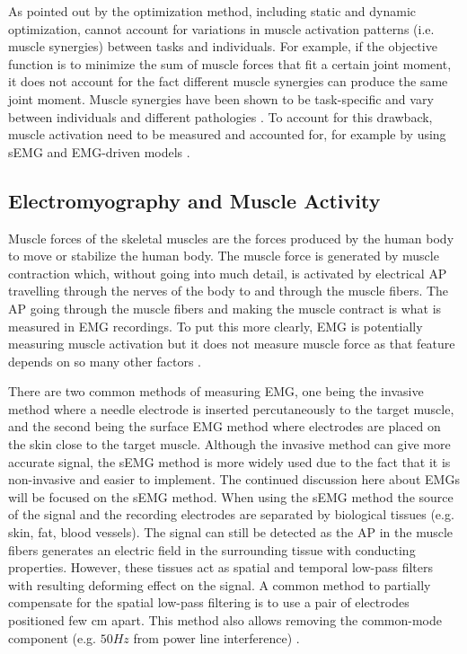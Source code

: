 As pointed out by \textcite{Pizzolato2015} the optimization method, including static and dynamic optimization, cannot account for variations in muscle activation patterns (i.e. muscle synergies) between tasks and individuals.
For example, if the objective function is to minimize the sum of muscle forces that fit a certain joint moment, it does not account for the fact different muscle synergies can produce the same joint moment. 
Muscle synergies have been shown to be task-specific and vary between individuals and different pathologies \cite{Ivanenko2016, Safavynia2011}.
To account for this drawback, muscle activation need to be measured and accounted for, for example by using \ac{sEMG} and \ac{EMG}-driven models \cite{Pizzolato2015}.

\subsection{Electromyography and Muscle Activity}
\label{sec:A-EMG}
Muscle forces of the skeletal muscles are the forces produced by the human body to move or stabilize the human body. 
The muscle force is generated by muscle contraction which, without going into much detail, is activated by electrical \ac{AP} travelling through the nerves of the body to and through the muscle fibers. 
The \ac{AP} going through the muscle fibers and making the muscle contract is what is measured in \ac{EMG} recordings.
To put this more clearly, \ac{EMG} is potentially measuring muscle activation but it does not measure muscle force as that feature depends on so many other factors \cite{Enoka2016}.

There are two common methods of measuring \ac{EMG}, one being the invasive method where a needle electrode is inserted percutaneously to the target muscle, and the second being the surface \ac{EMG} method where electrodes are placed on the skin close to the target muscle. 
Although the invasive method can give more accurate signal, the \ac{sEMG} method is more widely used due to the fact that it is non-invasive and easier to implement. 
The continued discussion here about \ac{EMG}s will be focused on the \ac{sEMG} method.
When using the \ac{sEMG} method the source of the signal and the recording electrodes are separated by biological tissues (e.g. skin, fat, blood vessels).
The signal can still be detected as the \ac{AP} in the muscle fibers generates an electric field in the surrounding tissue with conducting properties.
However, these tissues act as spatial and temporal low-pass filters with resulting deforming effect on the signal.
A common method to partially compensate for the spatial low-pass filtering is to use a pair of electrodes positioned few cm apart.
This method also allows removing the common-mode component (e.g. $50Hz$ from power line interference) \cite{Farina2016}.

